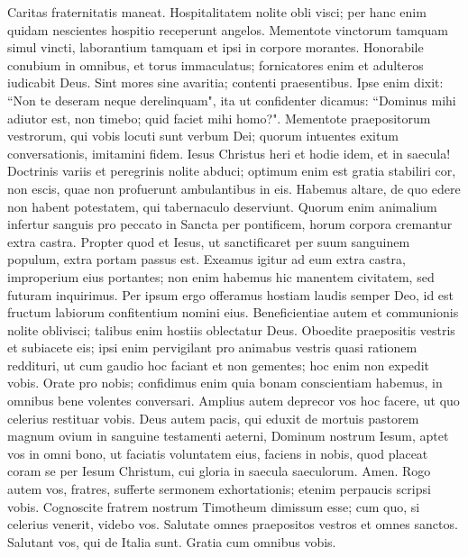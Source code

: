 \begin{biblechapter} 
\verse Caritas fraternitatis maneat. 
\verse Hospitalitatem nolite obli visci; per hanc enim quidam nescientes hospitio receperunt angelos. 
\verse Mementote vinctorum tamquam simul vincti, laborantium tamquam et ipsi in corpore morantes. 
\verse Honorabile conubium in omnibus, et torus immaculatus; fornicatores enim et adulteros iudicabit Deus. 
\verse Sint mores sine avaritia; contenti praesentibus. Ipse enim dixit: “Non te deseram neque derelinquam", 
\verse ita ut confidenter dicamus: “Dominus mihi adiutor est, non timebo; quid faciet mihi homo?". 
\verse Mementote praepositorum vestrorum, qui vobis locuti sunt verbum Dei; quorum intuentes exitum conversationis, imitamini fidem. 
\verse Iesus Christus heri et hodie idem, et in saecula! 
\verse Doctrinis variis et peregrinis nolite abduci; optimum enim est gratia stabiliri cor, non escis, quae non profuerunt ambulantibus in eis. 
\verse Habemus altare, de quo edere non habent potestatem, qui tabernaculo deserviunt. 
\verse Quorum enim animalium infertur sanguis pro peccato in Sancta per pontificem, horum corpora cremantur extra castra. 
\verse Propter quod et Iesus, ut sanctificaret per suum sanguinem populum, extra portam passus est. 
\verse Exeamus igitur ad eum extra castra, improperium eius portantes; 
\verse non enim habemus hic manentem civitatem, sed futuram inquirimus. 
\verse Per ipsum ergo offeramus hostiam laudis semper Deo, id est fructum labiorum confitentium nomini eius. 
\verse Beneficientiae autem et communionis nolite oblivisci; talibus enim hostiis oblectatur Deus. 
\verse Oboedite praepositis vestris et subiacete eis; ipsi enim pervigilant pro animabus vestris quasi rationem reddituri, ut cum gaudio hoc faciant et non gementes; hoc enim non expedit vobis. 
\verse Orate pro nobis; confidimus enim quia bonam conscientiam habemus, in omnibus bene volentes conversari. 
\verse Amplius autem deprecor vos hoc facere, ut quo celerius restituar vobis. 
\verse Deus autem pacis, qui eduxit de mortuis pastorem magnum ovium in sanguine testamenti aeterni, Dominum nostrum Iesum, 
\verse aptet vos in omni bono, ut faciatis voluntatem eius, faciens in nobis, quod placeat coram se per Iesum Christum, cui gloria in saecula saeculorum. Amen. 
\verse Rogo autem vos, fratres, sufferte sermonem exhortationis; etenim perpaucis scripsi vobis. 
\verse Cognoscite fratrem nostrum Timotheum dimissum esse; cum quo, si celerius venerit, videbo vos. 
\verse Salutate omnes praepositos vestros et omnes sanctos. Salutant vos, qui de Italia sunt. 
\verse Gratia cum omnibus vobis.
\end{biblechapter}
